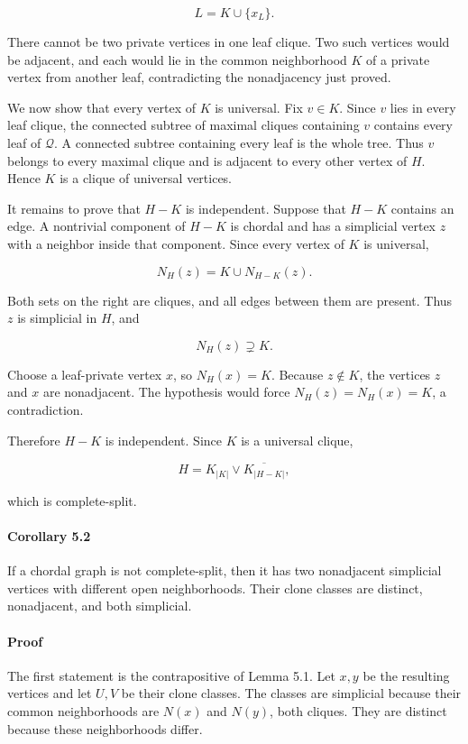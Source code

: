 \documentclass[
  american,
  11pt,
  a4paper,
]{article}
\begin{document}
\[
L=K\cup\{x_L\}.
\]

There cannot be two private vertices in one leaf clique. Two such vertices would be adjacent, and each would lie in the common neighborhood \(K\) of a private vertex from another leaf, contradicting the nonadjacency just proved.

We now show that every vertex of \(K\) is universal. Fix \(v\in K\). Since \(v\) lies in every leaf clique, the connected subtree of maximal cliques containing \(v\) contains every leaf of \(\mathcal Q\). A connected subtree containing every leaf is the whole tree. Thus \(v\) belongs to every maximal clique and is adjacent to every other vertex of \(H\). Hence \(K\) is a clique of universal vertices.

It remains to prove that \(H-K\) is independent. Suppose that \(H-K\) contains an edge. A nontrivial component of \(H-K\) is chordal and has a simplicial vertex \(z\) with a neighbor inside that component. Since every vertex of \(K\) is universal,

\[
N_H(z)=K\cup N_{H-K}(z).
\]

Both sets on the right are cliques, and all edges between them are present. Thus \(z\) is simplicial in \(H\), and

\[
N_H(z)\supsetneq K.
\]

Choose a leaf-private vertex \(x\), so \(N_H(x)=K\). Because \(z\notin K\), the vertices \(z\) and \(x\) are nonadjacent. The hypothesis would force \(N_H(z)=N_H(x)=K\), a contradiction.

Therefore \(H-K\) is independent. Since \(K\) is a universal clique,

\[
H=K_{|K|}\vee\overline{K_{|H-K|}},
\]

which is complete-split.

\paragraph{Corollary 5.2}\label{corollary-5.2}

If a chordal graph is not complete-split, then it has two nonadjacent simplicial vertices with different open neighborhoods. Their clone classes are distinct, nonadjacent, and both simplicial.

\paragraph{Proof}\label{proof-6}

The first statement is the contrapositive of Lemma 5.1. Let \(x,y\) be the resulting vertices and let \(U,V\) be their clone classes. The classes are simplicial because their common neighborhoods are \(N(x)\) and \(N(y)\), both cliques. They are distinct because these neighborhoods differ.
\end{document}
